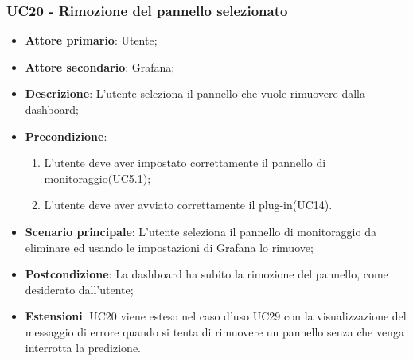 \subsubsection{UC20 - Rimozione del pannello selezionato}
\label{sssec:uc20}
\begin{itemize}
  \item \textbf{Attore primario}: Utente;
  \item \textbf{Attore secondario}: Grafana;
  \item \textbf{Descrizione}: L'utente seleziona il pannello che vuole rimuovere dalla dashboard;
  \item \textbf{Precondizione}:
  \begin{enumerate}
		\item L'utente deve aver impostato correttamente il pannello di monitoraggio(UC5.1);
		\item L'utente deve aver avviato correttamente il plug-in(UC14).
	\end{enumerate}
  \item \textbf{Scenario principale}: L'utente seleziona il pannello di monitoraggio da eliminare ed usando le impostazioni di Grafana lo rimuove;
  \item \textbf{Postcondizione}: La dashboard ha subito la rimozione del pannello, come desiderato dall'utente;
  \item \textbf{Estensioni}: UC20 viene esteso nel caso d'uso UC29 con la visualizzazione del messaggio di errore quando si tenta di rimuovere un pannello senza che venga interrotta la predizione.
\end{itemize}
